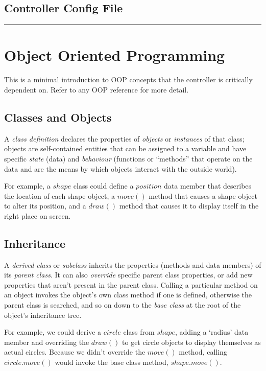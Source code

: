 \documentclass[11pt,a4paper]{report}
\begin{document}
\lstset{language=Python}

\section{Controller Config File}

\noindent
\rule{5cm}{.2mm}


\appendix

\chapter{Object Oriented Programming}

This is a minimal introduction to OOP concepts that the controller is
critically dependent on. Refer to any OOP reference for more detail.

\section{Classes and Objects}

A {\em class definition} declares the properties of {\em objects} or
{\em instances} of that class; objects are self-contained entities that
can be assigned to a variable and have specific {\em state} (data) and
{\em behaviour} (functions or ``methods'' that operate on the data and
are the means by which objects interact with the outside world).    

For example, a $shape$ class could define a $position$ data member that
describes the location of each shape object, a $move()$ method that
causes a shape object to alter its position, and a $draw()$ method that
causes it to display itself in the right place on screen.

\section{Inheritance}

A {\em derived class} or {\em subclass} inherits the properties (methods
and data members) of its {\em parent class}. It can also {\em override}
specific parent class properties, or add new properties that aren't
present in the parent class. Calling a particular method on an object
invokes the object's own class method if one is defined, otherwise the
parent class is searched, and so on down to the {\em base class} at the
root of the object's inheritance tree. 

For example, we could derive a $circle$ class from $shape$, adding a
`radius' data member and overriding the $draw()$ to get circle objects
to display themselves as actual circles.  Because we didn't override the
$move()$ method, calling $circle.move()$ would invoke the base class
method, $shape.move()$. 
\end{document}
